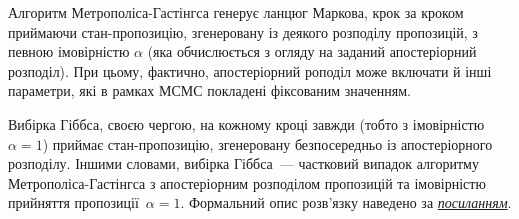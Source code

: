 Алгоритм Метрополіса-Гастінгса генерує ланцюг Маркова, крок за кроком приймаючи стан-пропозицію, згенеровану із деякого розподілу пропозицій, з певною імовірністю $\alpha$ (яка обчислюється з огляду на заданий апостеріорний розподіл). При цьому, фактично, апостеріорний роподіл може включати й інші параметри, які в рамках МСМС покладені фіксованим значенням. 

Вибірка Гіббса, своєю чергою, на кожному кроці завжди (тобто з імовірністю $\alpha=1$) приймає стан-пропозицію, згенеровану безпосередньо із апостеріорного розподілу. Іншими словами, вибірка Гіббса~--- частковий випадок алгоритму Метрополіса-Гастінгса з апостеріорним розподілом пропозицій та імовірністю прийняття пропозиції~$\alpha=1$. Формальний опис розв'язку наведено за \href{https://gregorygundersen.com/blog/2020/02/23/gibbs-sampling/}{\textit{посиланням}}.